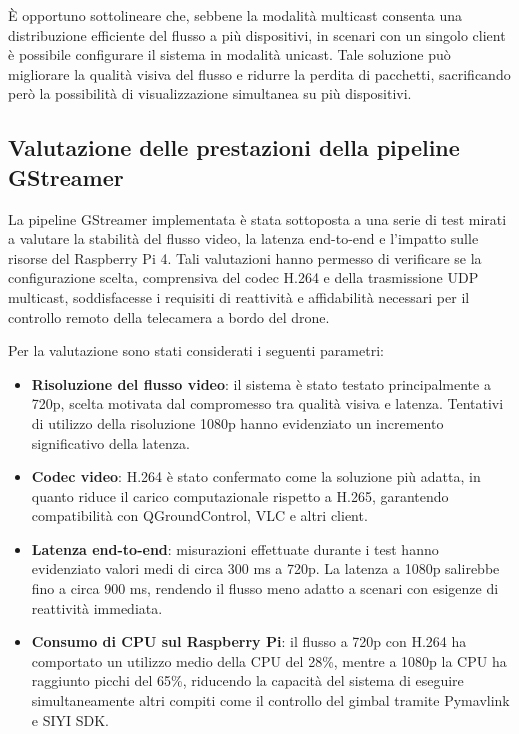 È opportuno sottolineare che, sebbene la modalità multicast consenta una distribuzione efficiente del flusso a più dispositivi, in scenari con un singolo client è possibile configurare il sistema in modalità unicast.  
Tale soluzione può migliorare la qualità visiva del flusso e ridurre la perdita di pacchetti, sacrificando però la possibilità di visualizzazione simultanea su più dispositivi.
\bigskip

\subsection{Valutazione delle prestazioni della pipeline GStreamer}

La pipeline GStreamer implementata è stata sottoposta a una serie di test mirati a valutare la stabilità del flusso video, la latenza end-to-end e l’impatto sulle risorse del Raspberry Pi 4.  
Tali valutazioni hanno permesso di verificare se la configurazione scelta, comprensiva del codec H.264 e della trasmissione UDP multicast, soddisfacesse i requisiti di reattività e affidabilità necessari per il controllo remoto della telecamera a bordo del drone.

Per la valutazione sono stati considerati i seguenti parametri:
\begin{itemize}
    \item \textbf{Risoluzione del flusso video}: il sistema è stato testato principalmente a 720p, scelta motivata dal compromesso tra qualità visiva e latenza. Tentativi di utilizzo della risoluzione 1080p hanno evidenziato un incremento significativo della latenza.
    \item \textbf{Codec video}: H.264 è stato confermato come la soluzione più adatta, in quanto riduce il carico computazionale rispetto a H.265, garantendo compatibilità con QGroundControl, VLC e altri client.
    \item \textbf{Latenza end-to-end}: misurazioni effettuate durante i test hanno evidenziato valori medi di circa 300 ms a 720p. La latenza a 1080p salirebbe fino a circa 900 ms, rendendo il flusso meno adatto a scenari con esigenze di reattività immediata.
    \item \textbf{Consumo di CPU sul Raspberry Pi}: il flusso a 720p con H.264 ha comportato un utilizzo medio della CPU del 28\%, mentre a 1080p la CPU ha raggiunto picchi del 65\%, riducendo la capacità del sistema di eseguire simultaneamente altri compiti come il controllo del gimbal tramite Pymavlink e SIYI SDK.
\end{itemize}

